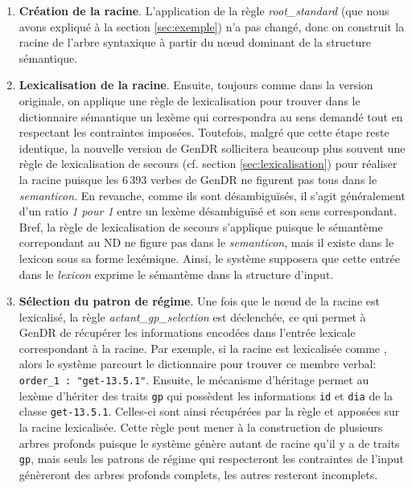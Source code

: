 \begin{enumerate}
  \item \textbf{Création de la racine}.
  L'application de la règle \emph{root\_standard} (que nous avons expliqué à la section \ref{sec:exemple}) n'a pas changé, donc on construit la racine de l'arbre syntaxique à partir du n\oe{}ud dominant de la structure sémantique.

  \item \textbf{Lexicalisation de la racine}.
  Ensuite, toujours comme dans la version originale, on applique une règle de lexicalisation pour trouver dans le dictionnaire sémantique un lexème qui correspondra au sens demandé tout en respectant les contraintes imposées. Toutefois, malgré que cette étape reste identique, la nouvelle version de GenDR sollicitera beaucoup plus souvent une règle de lexicalisation de secours (cf. section \ref{sec:lexicalisation}) pour réaliser la racine puisque les 6\,393 verbes de GenDR ne figurent pas tous dans le \emph{semanticon}. En revanche, comme ils sont désambiguïsés, il s'agit généralement d'un ratio \emph{1 pour 1} entre un lexème désambiguïsé et son sens correspondant. Bref, la règle de lexicalisation de secours s'applique puisque le sémantème correpondant au \ac{ND} ne figure pas dans le \emph{semanticon}, mais il existe dans le lexicon sous sa forme lexémique. Ainsi, le système supposera que cette entrée dans le \emph{lexicon} exprime le sémantème dans la structure d'input.

  \item \textbf{Sélection du patron de régime}.
  Une fois que le n\oe{}ud de la racine est lexicalisé, la règle \emph{actant\_gp\_selection} est déclenchée, ce qui permet à GenDR de récupérer les informations encodées dans l'entrée lexicale correspondant à la racine. Par exemple, si la racine est lexicalisée comme , alors le système parcourt le dictionnaire pour trouver ce membre verbal: \lstinline|order_1 : "get-13.5.1"|. Ensuite, le mécanisme d'héritage permet au lexème  d'hériter des traits \texttt{gp} qui possèdent les informations \texttt{id} et \texttt{dia} de la classe \texttt{get-13.5.1}. Celles-ci sont ainsi récupérées par la règle et apposées sur la racine lexicalisée. Cette règle peut mener à la construction de plusieurs arbres profonds puisque le système génère autant de racine qu'il y a de traits \texttt{gp}, mais seuls les patrons de régime qui respecteront les contraintes de l'input génèreront des arbres profonds complets, les autres resteront incomplets.
	

\end{enumerate}

